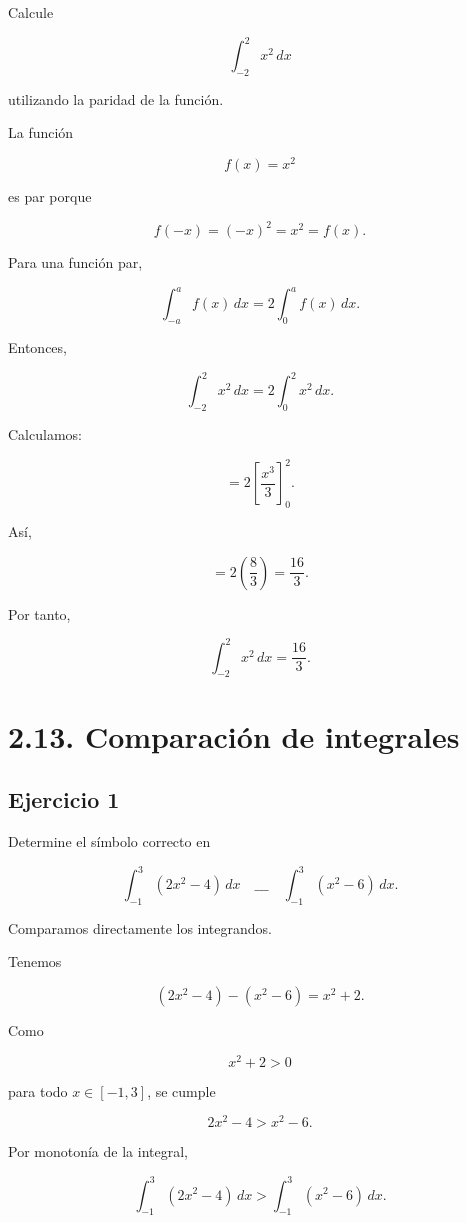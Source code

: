 \documentclass[12pt]{article}
\begin{document}
Calcule

\[
\int_{-2}^{2}x^2\,dx
\]

utilizando la paridad de la función.

La función

\[
f(x)=x^2
\]

es par porque

\[
f(-x)=(-x)^2=x^2=f(x).
\]

Para una función par,

\[
\int_{-a}^{a}f(x)\,dx
=
2\int_0^af(x)\,dx.
\]

Entonces,

\[
\int_{-2}^{2}x^2\,dx
=
2\int_0^2x^2\,dx.
\]

Calculamos:

\[
=
2
\left[
\frac{x^3}{3}
\right]_0^2.
\]

Así,

\[
=
2\left(\frac83\right)
=
\frac{16}{3}.
\]

Por tanto,

\[
\boxed{
\int_{-2}^{2}x^2\,dx
=
\frac{16}{3}
}.
\]

\section*{2.13. Comparación de integrales}

\subsection*{Ejercicio 1}

Determine el símbolo correcto en

\[
\int_{-1}^{3}(2x^2-4)\,dx
\quad\_\_\_\quad
\int_{-1}^{3}(x^2-6)\,dx.
\]

Comparamos directamente los integrandos.

Tenemos

\[
(2x^2-4)-(x^2-6)
=
x^2+2.
\]

Como

\[
x^2+2>0
\]

para todo \(x\in[-1,3]\), se cumple

\[
2x^2-4>x^2-6.
\]

Por monotonía de la integral,

\[
\int_{-1}^{3}(2x^2-4)\,dx
>
\int_{-1}^{3}(x^2-6)\,dx.
\]
\end{document}
